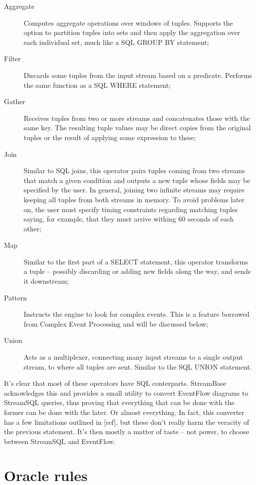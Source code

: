 \documentclass{report}
\begin{document}
\begin{description}
\item [Aggregate] Computes aggregate operations over windows of tuples. Supports the option to partition tuples into sets and then apply the aggregation over each individual set, much like a SQL GROUP BY statement;
\item [Filter] Discards some tuples from the input stream based on a predicate. Performs the same function as a SQL WHERE statement;
\item [Gather] Receives tuples from two or more streams and concatenates those with the same key. The resulting tuple values may be direct copies from the original tuples or the result of applying some expression to these;
\item [Join] Similar to SQL joins, this operator pairs tuples coming from two streams that match a given condition and outputs a new tuple whose fields may be specified by the user. In general, joining two infinite streams may require keeping all tuples from both streams in memory. To avoid problems later on, the user must specify timing constraints regarding matching tuples saying, for example, that they must arrive withing 60 seconds of each other;
\item [Map] Similar to the first part of a SELECT statement, this operator transforms a tuple -- possibly discarding or adding new fields along the way, and sends it downstream;
\item [Pattern] Instructs the engine to look for complex events. This is a feature borrowed from Complex Event Processing and will be discussed below;
\item [Union] Acts as a multiplexer, connecting many input streams to a single output stream, to where all tuples are sent. Similar to the SQL UNION statement.
\end{description}

It's clear that most of these operators have SQL conterparts. StreamBase acknowledges this and provides a small utility to convert EventFlow diagrams to StreamSQL queries, thus proving that everything that can be done with the former can be done with the later. Or almost everything. In fact, this converter has a few limitations outlined in [ref], but these don't really harm the veracity of the previous statement. It's then mostly a matter of taste -- not power, to choose between StreamSQL and EventFlow.

\section{Oracle rules}
\end{document}
